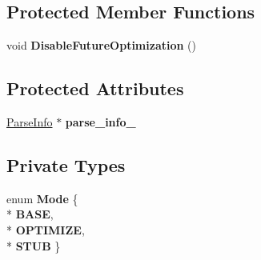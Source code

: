 \subsection*{Protected Member Functions}
\begin{DoxyCompactItemize}
\item 
void {\bfseries Disable\+Future\+Optimization} ()\hypertarget{classv8_1_1internal_1_1_compilation_info_ad0a125c9ea29f2aed43a99ca8fd09d54}{}\label{classv8_1_1internal_1_1_compilation_info_ad0a125c9ea29f2aed43a99ca8fd09d54}

\end{DoxyCompactItemize}
\subsection*{Protected Attributes}
\begin{DoxyCompactItemize}
\item 
\hyperlink{classv8_1_1internal_1_1_parse_info}{Parse\+Info} $\ast$ {\bfseries parse\+\_\+info\+\_\+}\hypertarget{classv8_1_1internal_1_1_compilation_info_aae456faaa41b338a45658d75a0dad3e2}{}\label{classv8_1_1internal_1_1_compilation_info_aae456faaa41b338a45658d75a0dad3e2}

\end{DoxyCompactItemize}
\subsection*{Private Types}
\begin{DoxyCompactItemize}
\item 
enum {\bfseries Mode} \{ \\*
{\bfseries B\+A\+SE}, 
\\*
{\bfseries O\+P\+T\+I\+M\+I\+ZE}, 
\\*
{\bfseries S\+T\+UB}
 \}\hypertarget{classv8_1_1internal_1_1_compilation_info_ad1acd578da9cf8e3fc0da67c5abdfc2a}{}\label{classv8_1_1internal_1_1_compilation_info_ad1acd578da9cf8e3fc0da67c5abdfc2a}

\end{DoxyCompactItemize}
